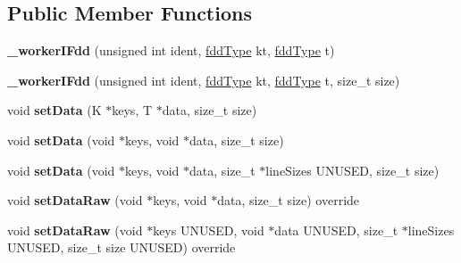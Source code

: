 \subsection*{Public Member Functions}
\begin{DoxyCompactItemize}
\item 
\hypertarget{classfaster_1_1__workerIFdd_a08037ef118ef3e86a3b1926f4d11d443}{}\label{classfaster_1_1__workerIFdd_a08037ef118ef3e86a3b1926f4d11d443} 
{\bfseries \+\_\+worker\+I\+Fdd} (unsigned int ident, \hyperlink{namespacefaster_aa8898687bc64536b60a3d5f365060cd6}{fdd\+Type} kt, \hyperlink{namespacefaster_aa8898687bc64536b60a3d5f365060cd6}{fdd\+Type} t)
\item 
\hypertarget{classfaster_1_1__workerIFdd_a310dd5f9799da46d3fecf15c917a5b46}{}\label{classfaster_1_1__workerIFdd_a310dd5f9799da46d3fecf15c917a5b46} 
{\bfseries \+\_\+worker\+I\+Fdd} (unsigned int ident, \hyperlink{namespacefaster_aa8898687bc64536b60a3d5f365060cd6}{fdd\+Type} kt, \hyperlink{namespacefaster_aa8898687bc64536b60a3d5f365060cd6}{fdd\+Type} t, size\+\_\+t size)
\item 
\hypertarget{classfaster_1_1__workerIFdd_a7c25eaec0cb983ca8d3891886f4d2e3e}{}\label{classfaster_1_1__workerIFdd_a7c25eaec0cb983ca8d3891886f4d2e3e} 
void {\bfseries set\+Data} (K $\ast$keys, T $\ast$data, size\+\_\+t size)
\item 
\hypertarget{classfaster_1_1__workerIFdd_a72512bdb22ef328a7eaa98af26c637c9}{}\label{classfaster_1_1__workerIFdd_a72512bdb22ef328a7eaa98af26c637c9} 
void {\bfseries set\+Data} (void $\ast$keys, void $\ast$data, size\+\_\+t size)
\item 
\hypertarget{classfaster_1_1__workerIFdd_a612ec6f32a16bb384b353f06063573c0}{}\label{classfaster_1_1__workerIFdd_a612ec6f32a16bb384b353f06063573c0} 
void {\bfseries set\+Data} (void $\ast$keys, void $\ast$data, size\+\_\+t $\ast$line\+Sizes U\+N\+U\+S\+ED, size\+\_\+t size)
\item 
\hypertarget{classfaster_1_1__workerIFdd_afe2037df84a871a1d1971295460de648}{}\label{classfaster_1_1__workerIFdd_afe2037df84a871a1d1971295460de648} 
void {\bfseries set\+Data\+Raw} (void $\ast$keys, void $\ast$data, size\+\_\+t size) override
\item 
\hypertarget{classfaster_1_1__workerIFdd_ae8acb90658c5051a34a71bc03e43bf1e}{}\label{classfaster_1_1__workerIFdd_ae8acb90658c5051a34a71bc03e43bf1e} 
void {\bfseries set\+Data\+Raw} (void $\ast$keys U\+N\+U\+S\+ED, void $\ast$data U\+N\+U\+S\+ED, size\+\_\+t $\ast$line\+Sizes U\+N\+U\+S\+ED, size\+\_\+t size U\+N\+U\+S\+ED) override

\end{DoxyCompactItemize}
